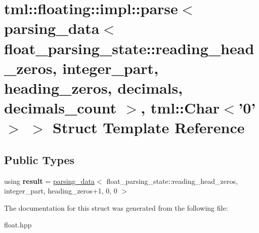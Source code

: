 \hypertarget{structtml_1_1floating_1_1impl_1_1parse_3_01parsing__data_3_01float__parsing__state_1_1reading__h2418dec59ad1c62538b030a2e2ae01a5}{\section{tml\+:\+:floating\+:\+:impl\+:\+:parse$<$ parsing\+\_\+data$<$ float\+\_\+parsing\+\_\+state\+:\+:reading\+\_\+head\+\_\+zeros, integer\+\_\+part, heading\+\_\+zeros, decimals, decimals\+\_\+count $>$, tml\+:\+:Char$<$'0'$>$ $>$ Struct Template Reference}
\label{structtml_1_1floating_1_1impl_1_1parse_3_01parsing__data_3_01float__parsing__state_1_1reading__h2418dec59ad1c62538b030a2e2ae01a5}
}
\subsection*{Public Types}
\begin{DoxyCompactItemize}
\item 
\hypertarget{structtml_1_1floating_1_1impl_1_1parse_3_01parsing__data_3_01float__parsing__state_1_1reading__h2418dec59ad1c62538b030a2e2ae01a5_ab1688445103726535d8adefa7cbc8813}{using {\bfseries result} = \hyperlink{structtml_1_1floating_1_1impl_1_1parsing__data}{parsing\+\_\+data}$<$ float\+\_\+parsing\+\_\+state\+::reading\+\_\+head\+\_\+zeros, integer\+\_\+part, heading\+\_\+zeros+1, 0, 0 $>$}\label{structtml_1_1floating_1_1impl_1_1parse_3_01parsing__data_3_01float__parsing__state_1_1reading__h2418dec59ad1c62538b030a2e2ae01a5_ab1688445103726535d8adefa7cbc8813}

\end{DoxyCompactItemize}


The documentation for this struct was generated from the following file\+:\begin{DoxyCompactItemize}
\item 
float.\+hpp\end{DoxyCompactItemize}
